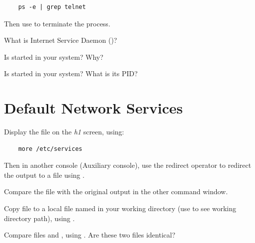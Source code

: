 \documentclass{../UTNetLab}
\begin{document}
\begin{lstlisting}
	ps -e | grep telnet
\end{lstlisting}
Then use  to terminate the  process.

\begin{report}
    \item What is Internet Service Daemon ()?

    \item Is  started in your system? Why?

    \item Is  started in your system? What is its PID?
\end{report}

\section{Default Network Services}
Display the file  on the \textit{h1} screen, using:

\begin{lstlisting}
	more /etc/services
\end{lstlisting}

Then in another console (Auxiliary console), use the redirect operator to redirect the  output to
a file using .


Compare the file  with the original  output in the other command window.

Copy  file to a local file named  in your working directory (use  to see working directory path),
using .


Compare files  and , using .
Are these two files identical?

\end{document}
